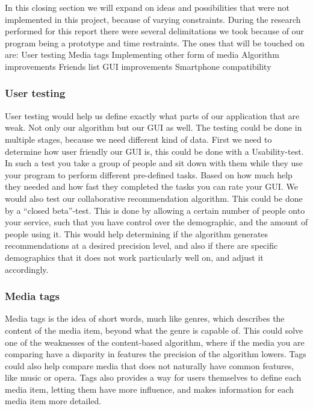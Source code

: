In this closing section we will expand on ideas and possibilities that were not implemented in this project, because of varying constraints. During the research performed for this report there were several delimitations we took because of our program being a prototype and time restraints. The ones that will be touched on are:
User testing
Media tags
Implementing other form of media
Algorithm improvements
Friends list
GUI improvements
Smartphone compatibility 

\subsubsection{User testing}
User testing would help us define exactly what parts of our application that are weak. Not only our algorithm but our GUI as well. The testing could be done in multiple stages, because we need different kind of data. First we need to determine how user friendly our GUI is, this could be done with a Usability-test. In such a test you take a group of people and sit down with them while they use your program to perform different pre-defined tasks. Based on how much help they needed and how fast they completed the tasks you can rate your GUI. We would also test our collaborative recommendation algorithm. This could be done by a “closed beta”-test. This is done by allowing a certain number of people onto your service, such that you have control over the demographic, and the amount of people using it. This would help determining if the algorithm generates recommendations at a desired precision level, and also if there are specific demographics that it does not work particularly well on, and adjust it accordingly.

\subsubsection{Media tags}\label{futureWork:Tags}
Media tags is the idea of short words, much like genres, which describes the content of the media item, beyond what the genre is capable of. This could solve one of the weaknesses of the content-based algorithm, where if the media you are comparing have a disparity in features the precision of the algorithm lowers. Tags could also help compare media that does not naturally have common features, like music or opera. Tags also provides a way for users themselves to define each media item, letting them have more influence, and makes information for each media item more detailed.

